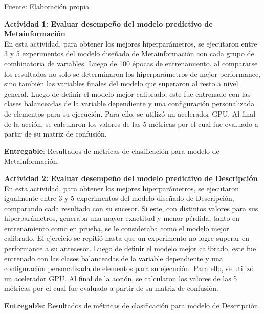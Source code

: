 \begin{flushleft}	%
	\small Fuente: Elaboración propia
\end{flushleft}

\textbf{Actividad 1: Evaluar desempeño del modelo predictivo de Metainformación}
\\
En esta actividad, para obtener los mejores hiperparámetros, se ejecutaron entre 3 y 5 experimentos del modelo diseñado de Metainformación con cada grupo de combinatoria de variables. Luego de 100 épocas de entrenamiento, al compararse los resultados no solo se determinaron los hiperparámetros de mejor performance, sino también las variables finales del modelo que superaron al resto a nivel general. Luego de definir el modelo mejor calibrado, este fue entrenado con las clases balanceadas de la variable dependiente y una configuración personalizada de elementos para su ejecución. Para ello, se utilizó un acelerador GPU. Al final de la acción, se calcularon los valores de las 5 métricas por el cual fue evaluado a partir de su matriz de confusión.

\textbf{Entregable}: Resultados de métricas de clasificación para modelo de Metainformación.

\textbf{Actividad 2: Evaluar desempeño del modelo predictivo de Descripción}
\\
En esta actividad, para obtener los mejores hiperparámetros, se ejecutaron igualmente entre 3 y 5 experimentos del modelo diseñado de Descripción, comparando cada resultado con su sucesor. Si este, con distintos valores para sus hiperparámetros, generaba una mayor exactitud y menor pérdida, tanto en entrenamiento como en prueba, se le consideraba como el modelo mejor calibrado. El ejercicio se repitió hasta que un experimento no logre superar en performance a su antecesor. Luego de definir el modelo mejor calibrado, este fue entrenado con las clases balanceadas de la variable dependiente y una configuración personalizada de elementos para su ejecución. Para ello, se utilizó un acelerador GPU. Al final de la acción, se calcularon los valores de las 5 métricas por el cual fue evaluado a partir de su matriz de confusión.

\textbf{Entregable}: Resultados de métricas de clasificación para modelo de Descripción.

